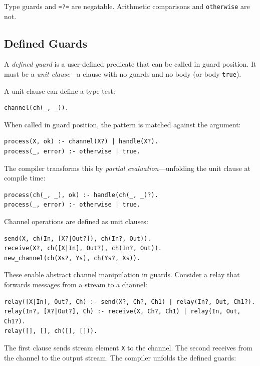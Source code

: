Type guards and \verb|=?=| are negatable. Arithmetic comparisons and \verb|otherwise| are not.

\subsection{Defined Guards}
\label{sec:defined-guards}

A \emph{defined guard} is a user-defined predicate that can be called in guard position. It must be a \emph{unit clause}---a clause with no guards and no body (or body \verb|true|).

A unit clause can define a type test:

\begin{verbatim}
channel(ch(_, _)).
\end{verbatim}

When called in guard position, the pattern is matched against the argument:

\begin{verbatim}
process(X, ok) :- channel(X?) | handle(X?).
process(_, error) :- otherwise | true.
\end{verbatim}

The compiler transforms this by \emph{partial evaluation}---unfolding the unit clause at compile time:

\begin{verbatim}
process(ch(_, _), ok) :- handle(ch(_, _)?).
process(_, error) :- otherwise | true.
\end{verbatim}

Channel operations are defined as unit clauses:

\begin{verbatim}
send(X, ch(In, [X?|Out?]), ch(In?, Out)).
receive(X?, ch([X|In], Out?), ch(In?, Out)).
new_channel(ch(Xs?, Ys), ch(Ys?, Xs)).
\end{verbatim}

These enable abstract channel manipulation in guards. Consider a relay that forwards messages from a stream to a channel:

\begin{verbatim}
relay([X|In], Out?, Ch) :- send(X?, Ch?, Ch1) | relay(In?, Out, Ch1?).
relay(In?, [X?|Out?], Ch) :- receive(X, Ch?, Ch1) | relay(In, Out, Ch1?).
relay([], [], ch([], [])).
\end{verbatim}

The first clause sends stream element \verb|X| to the channel. The second receives from the channel to the output stream. The compiler unfolds the defined guards:

